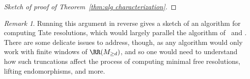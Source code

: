 \documentclass[12pt]{amsart}
\theoremstyle{definition}
\theoremstyle{remark}
\newtheorem{remark}[lemma]{Remark}
\newcommand{\Tate}{{\mathbf{T}}}
\newcommand{\ZZ}{\mathbb Z}
\newcommand{\Pic}{\operatorname{Pic}}
\begin{document}
\begin{proof}[Sketch of proof of Theorem~\ref{thm:alg characterization}]
%
%
%
\end{proof}
\begin{remark}
Running this argument in reverse gives a sketch of an algorithm for computing Tate resolutions, which would largely parallel the algorithm of~\cite{EFS} and \cite{eisenbud-decker}.  There are some delicate issues to address, though, as any algorithm would only work with finite windows of $\RR(M_{\geq d})$, and so one would need to understand how such truncations affect the process of computing minimal free resolutions, lifting endomorphisms, and more.
\end{remark}
\end{document}

